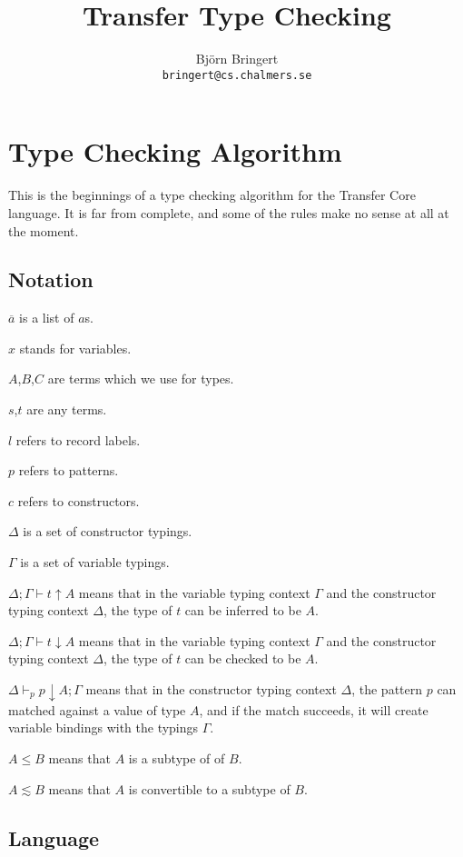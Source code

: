 \documentclass[a4paper,11pt]{article}
\begin{document}
\title{Transfer Type Checking}
\author{Bj\"orn Bringert \\ \texttt{bringert@cs.chalmers.se}}
\maketitle

\section{Type Checking Algorithm}

This is the beginnings of a type checking algorithm for the 
Transfer Core language. It is far from complete,
and some of the rules make no sense at all at the moment.

\subsection{Notation}

$\overline{a}$ is a list of $a$s. 

$x$ stands for variables.

$A$,$B$,$C$ are terms which we use for types.

$s$,$t$ are any terms.

$l$ refers to record labels.

$p$ refers to patterns.

$c$ refers to constructors.

$\Delta$ is a set of constructor typings.

$\Gamma$ is a set of variable typings.

$\Delta;\Gamma \vdash t \uparrow A$ means that in the
variable typing context $\Gamma$ and the constructor
typing context $\Delta$, the type of $t$ can be inferred 
to be $A$.

$\Delta;\Gamma \vdash t \downarrow A$ means that in the
variable typing context $\Gamma$ and the constructor
typing context $\Delta$, the type of $t$ can be 
checked to be $A$.

$\Delta \vdash_p p \downarrow A; \Gamma$ means that
in the constructor typing context $\Delta$,
the pattern $p$ can matched against a value of type
$A$, and if the match succeeds, it will create
variable bindings with the typings $\Gamma$.

$A \leq B$ means that $A$ is a subtype of of $B$.

$A \lesssim B$ means that $A$ is convertible
to a subtype of $B$.

\subsection{Language}
\end{document}
